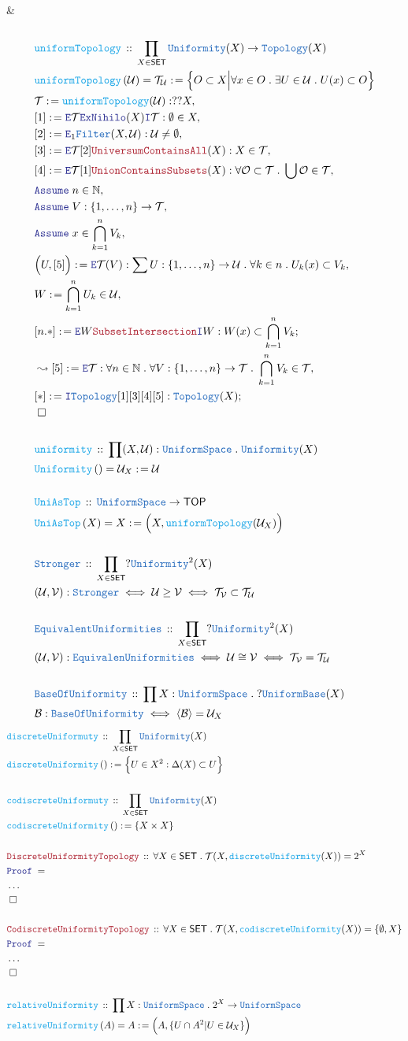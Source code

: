 \documentclass[12pt]{scrartcl}
\newcommand{\TYPE}[1]{\textcolor{NavyBlue}{\mathtt{#1}}}
\newcommand{\FUNC}[1]{\textcolor{Cerulean}{\mathtt{#1}}}
\newcommand{\LOGIC}[1]{\textcolor{Blue}{\mathtt{#1}}}
\newcommand{\THM}[1]{\textcolor{Maroon}{\mathtt{#1}}}
\renewcommand{\.}{\; . \;}
\newcommand{\de}{: \kern 0.1pc =}
\newcommand{\Act}[1]{\left( #1 \right)}
\newcommand{\Theorem}[2]{& \THM{#1} \, :: \, #2 \\ & \Proof = \\ }
\newcommand{\DeclareType}[2]{& \TYPE{#1} \, :: \, #2 \\}
\newcommand{\DefineType}[3]{& #1 : \TYPE{#2} \iff #3 \\}
\newcommand{\DefineNamedType}[4]{& #1 : \TYPE{#2} \iff #3 \iff #4 \\}
\newcommand{\DeclareFunc}[2]{& \FUNC{#1} \, :: \, #2 \\}
\newcommand{\DefineFunc}[3]{&  \FUNC{#1}\Act{#2} \de #3 \\}
\newcommand{\DefineNamedFunc}[4]{&  \FUNC{#1}\Act{#2} = #3 \de #4 \\}
\newcommand{\Page}[1]{ \begin{align*} #1 \end{align*}   }
\newcommand{\NoProof}{ & \ldots \\ \EndProof}
\newcommand{\Nat}{\mathbb{N} }
\newcommand{\Say}[3]{& #1 \de #2 : #3, \\}
\newcommand{\SayIn}[3]{& #1 \de #2 \in #3, \\}
\newcommand{\Conclude}[3]{& #1 \de #2 : #3; \\}
\newcommand{\Derive}[3]{& \leadsto #1 \de #2 : #3, \\}
\newcommand{\Assume}[2]{& \LOGIC{Assume} \; #1 : #2, \\}
\newcommand{\AssumeIn}[2]{& \LOGIC{Assume} \; #1 \in #2, \\}
\newcommand{\Intro}{\LOGIC{I}}
\newcommand{\Elim}{\LOGIC{E}}
\newcommand{\QED}{\; \square}
\newcommand{\EndProof}{& \QED \\}
\newcommand{\Proof}{\LOGIC{Proof} \; }
\newcommand{\B}{\mathcal{B}}
\newcommand{\SET}{\mathsf{SET}}
\newcommand{\TOP}{\mathsf{TOP}}
\newcommand{\T}{\mathcal{T}}
\renewcommand{\U}{\mathcal{U}}
\renewcommand{\O}{\mathcal{O}}
\newcommand{\Unif}{\TYPE{Uniformity}}
\newcommand{\US}{\TYPE{UniformSpace}}
\newcommand{\UB}{\TYPE{UniformBase}}
\newcommand{\V}{\mathcal{V}}
\begin{document}
{{	}
	\EndProof
	\\
}\Page{
	\DeclareFunc{uniformTopology}
	{
		\prod_{X \in \SET}
		\Unif(X) \to \TYPE{Topology}(X)
	}
	\DefineNamedFunc{uniformTopology}{\U}{\T_\U}{
		\Big\{
				O \subset X \Big| 
				\forall x \in O \. \exists U \in \U \. U(x) \subset O  
		\Big\}
	}
	\Say{\T}{\FUNC{uniformTopology}(\U)}
	{
		??X	
	}
	\Say{[1]}{\Elim \T \LOGIC{ExNihilo}(X) \Intro \T}
	{
		\emptyset \in X
	}
	\Say{[2]}{\Elim_1 \TYPE{Filter}(X,\U)}{\U \neq \emptyset}
	\Say{[3]}{\Elim \T [2] \THM{UniversumContainsAll}(X)}
	{
		X \in \T
	}
	\Say{[4]}{\Elim \T [1] \THM{UnionContainsSubsets}(X)}
	{
		\forall \O \subset \T \. \bigcup \O \in \T
	}
	\AssumeIn{n}{\Nat}
	\Assume{V}{\{1,\ldots,n\} \to \T}
	\AssumeIn{x}{\bigcap^n_{k=1} V_k}
	\Say{\Big(U,[5]\Big)}{\Elim \T(V)}
	{
		\sum U : \{1,\ldots,n\} \to \U \.
		\forall k \in n \.
		U_k(x) \subset V_k
	}
	\SayIn{W}{\bigcap^n_{k=1} U_k}{\U}
	\Conclude{[n.*]}{\Elim W \THM{SubsetIntersection} \Intro W}
	{
		W(x) \subset \bigcap^n_{k=1} V_k
	}
	\Derive{[5]}
	{
		\Elim \T
	}
	{
		\forall n \in \Nat \.
		\forall V : \{1,\ldots,n\} \to \T \.
		\bigcap^n_{k=1} V_k \in \T
	}
	\Conclude{[*]}
	{
		\Intro \TYPE{Topology} [1][3][4][5]
	}
	{
		\TYPE{Topology}(X)
	}
	\EndProof
	\\
	\DeclareFunc{uniformity}
	{
		\prod (X,\U) : \US \. \Unif(X)
	}
	\DefineNamedFunc{Uniformity}{}{\U_X}{\U}
	\\
	\DeclareFunc{UniAsTop}
	{
		\US \to \TOP
	}
	\DefineNamedFunc{UniAsTop}{X}{X}{\Big(X,\FUNC{uniformTopology}(\U_X)\Big)}
	\\
	\DeclareType{Stronger}{\prod_{X \in \SET} ?\Unif^2(X)}
	\DefineNamedType{(\U,\V)}{Stronger}{\U \ge \V}
	{
		\T_\V \subset \T_\U
	}
	\\
	\DeclareType{EquivalentUniformities}{\prod_{X \in \SET} ?\Unif^2(X)}
	\DefineNamedType{(\U,\V)}{EquivalenUniformities}{\U \cong \V}
	{
		\T_\V  = \T_\U
	}
	\\
	\DeclareType{BaseOfUniformity}
	{
		\prod X : \US \. ? \UB(X)
	}
	\DefineType{\B}{BaseOfUniformity}{ \langle \B \rangle = \U_X }
}
\Page{
	\DeclareFunc{discreteUniformuty}{\prod_{X \in \SET} \Unif(X)}
	\DefineFunc{discreteUniformity}{}{\Big\{ U \in X^2 : \Delta(X) \subset U \Big\}}
	\\	
	\DeclareFunc{codiscreteUniformuty}{\prod_{X \in \SET} \Unif(X)}
	\DefineFunc{codiscreteUniformity}{}{\{ X \times X \}}
	\\
	\Theorem{DiscreteUniformityTopology}
	{ 
		\forall X \in \SET \.
		\T(X,\FUNC{discreteUniformity}(X)) = 2^X	
	}
	\NoProof
	\\
	\Theorem{CodiscreteUniformityTopology}
	{ 
		\forall X \in \SET \.
		\T(X,\FUNC{codiscreteUniformity}(X)) = \{ \emptyset, X  \}	
	}
	\NoProof
	\\
	\DeclareFunc{relativeUniformity}
	{
		\prod X : \US \.  2^X \to \US
	}
	\DefineNamedFunc{relativeUniformity}{A}{A}
	{
		\Big( A,	\{ U \cap A^2 | U \in \U_X \} \Big)
	}
}
\newpage
\end{document}
